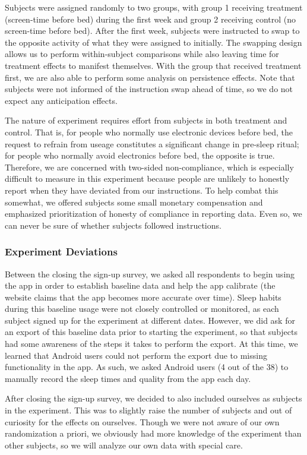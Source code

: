 \documentclass[]{article}
\begin{document}
Subjects were assigned randomly to two groups, with group 1 receiving
treatment (screen-time before bed) during the first week and group 2
receiving control (no screen-time before bed). After the first week,
subjects were instructed to swap to the opposite activity of what they
were assigned to initially. The swapping design allows us to perform
within-subject comparisons while also leaving time for treatment effects
to manifest themselves. With the group that received treatment first, we
are also able to perform some analysis on persistence effects. Note that
subjects were not informed of the instruction swap ahead of time, so we
do not expect any anticipation effects.

The nature of experiment requires effort from subjects in both treatment
and control. That is, for people who normally use electronic devices
before bed, the request to refrain from useage constitutes a significant
change in pre-sleep ritual; for people who normally avoid electronics
before bed, the opposite is true. Therefore, we are concerned with
two-sided non-compliance, which is especially difficult to measure in
this experiment because people are unlikely to honestly report when they
have deviated from our instructions. To help combat this somewhat, we
offered subjects some small monetary compensation and emphasized
prioritization of honesty of compliance in reporting data. Even so, we
can never be sure of whether subjects followed instructions.

\subsubsection{Experiment Deviations}\label{experiment-deviations}

Between the closing the sign-up survey, we asked all respondents to
begin using the app in order to establish baseline data and help the app
calibrate (the website claims that the app becomes more accurate over
time). Sleep habits during this baseline usage were not closely
controlled or monitored, as each subject signed up for the experiment at
different dates. However, we did ask for an export of this baseline data
prior to starting the experiment, so that subjects had some awareness of
the steps it takes to perform the export. At this time, we learned that
Android users could not perform the export due to missing functionality
in the app. As such, we asked Android users (4 out of the 38) to
manually record the sleep times and quality from the app each day.

After closing the sign-up survey, we decided to also included ourselves
as subjects in the experiment. This was to slightly raise the number of
subjects and out of curiosity for the effects on ourselves. Though we
were not aware of our own randomization a priori, we obviously had more
knowledge of the experiment than other subjects, so we will analyze our
own data with special care.
\end{document}
